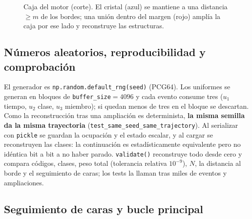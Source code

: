 \documentclass[11pt,a4paper]{article}
\newcommand{\code}[1]{\texttt{#1}}
\begin{document}
\begin{figure}[t]
\centering
{}
\caption{Caja del motor (corte). El cristal (azul) se mantiene a una distancia $\ge m$ de los bordes;
una unión dentro del margen (rojo) amplía la caja por ese lado y reconstruye las estructuras.}
\label{fig:caja}
\end{figure}

\subsection{Números aleatorios, reproducibilidad y comprobación}

El generador es \code{np.random.default\_rng(seed)} (PCG64). Los uniformes se generan en bloques de
\code{buffer\_size}$=4096$ y cada evento consume tres ($u_1$ tiempo, $u_2$ clase, $u_3$ miembro); si
quedan menos de tres en el bloque se descartan. Como la reconstrucción tras una ampliación es
determinista, \textbf{la misma semilla da la misma trayectoria} (\code{test\_same\_seed\_same\_trajectory}).
Al serializar con \code{pickle} se guardan la ocupación y el estado escalar, y al cargar se
reconstruyen las clases: la continuación es estadísticamente equivalente pero no idéntica bit a bit a
no haber parado. \code{validate()} reconstruye todo desde cero y compara códigos, clases, peso total
(tolerancia relativa $10^{-9}$), $N$, la distancia al borde y el seguimiento de caras; los tests la
llaman tras miles de eventos y ampliaciones.

\subsection{Seguimiento de caras y bucle principal}
\label{sec:caras}
\end{document}
